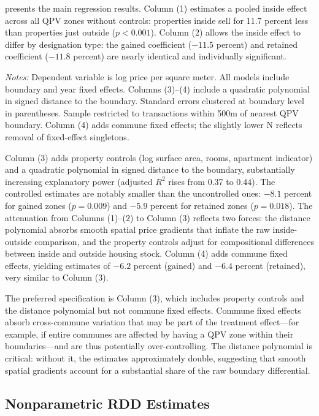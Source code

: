 \documentclass[12pt]{article}
\begin{document}
 presents the main regression results. Column (1) estimates a pooled inside effect across all QPV zones without controls: properties inside sell for 11.7 percent less than properties just outside ($p < 0.001$). Column (2) allows the inside effect to differ by designation type: the gained coefficient ($-11.5$ percent) and retained coefficient ($-11.8$ percent) are nearly identical and individually significant.



\noindent\textit{Notes:} Dependent variable is log price per square meter. All models include boundary and year fixed effects. Columns (3)--(4) include a quadratic polynomial in signed distance to the boundary. Standard errors clustered at boundary level in parentheses. Sample restricted to transactions within 500m of nearest QPV boundary. Column (4) adds commune fixed effects; the slightly lower N reflects removal of fixed-effect singletons.

Column (3) adds property controls (log surface area, rooms, apartment indicator) and a quadratic polynomial in signed distance to the boundary, substantially increasing explanatory power (adjusted $R^2$ rises from 0.37 to 0.44). The controlled estimates are notably smaller than the uncontrolled ones: $-8.1$ percent for gained zones ($p = 0.009$) and $-5.9$ percent for retained zones ($p = 0.018$). The attenuation from Columns (1)--(2) to Column (3) reflects two forces: the distance polynomial absorbs smooth spatial price gradients that inflate the raw inside-outside comparison, and the property controls adjust for compositional differences between inside and outside housing stock. Column (4) adds commune fixed effects, yielding estimates of $-6.2$ percent (gained) and $-6.4$ percent (retained), very similar to Column (3).

The preferred specification is Column (3), which includes property controls and the distance polynomial but not commune fixed effects. Commune fixed effects absorb cross-commune variation that may be part of the treatment effect---for example, if entire communes are affected by having a QPV zone within their boundaries---and are thus potentially over-controlling. The distance polynomial is critical: without it, the estimates approximately double, suggesting that smooth spatial gradients account for a substantial share of the raw boundary differential.

\subsection{Nonparametric RDD Estimates}
\end{document}
